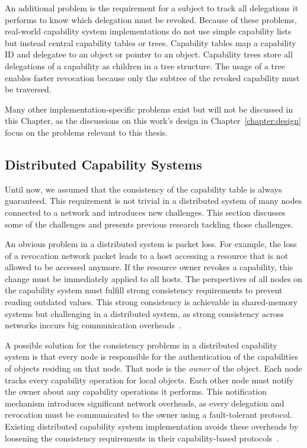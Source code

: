 An additional problem is the requirement for a subject to track all delegations it performs to know which delegation must be revoked. Because of these problems, real-world capability system implementations do not use simple capability lists but instead central capability tables or trees. Capability tables map a capability ID and delegatee to an object or pointer to an object. Capability trees store all delegations of a capability as children in a tree structure. The usage of a tree enables faster revocation because only the subtree of the revoked capability must be traversed.

Many other implementation-specific problems exist but will not be discussed in this Chapter, as the discussions on this work's design in Chapter~\ref{chapter:design} focus on the problems relevant to this thesis.

\subsection{Distributed Capability Systems}
Until now, we assumed that the consistency of the capability table is always guaranteed. This requirement is not trivial in a distributed system of many nodes connected to a network and introduces new challenges. This section discusses some of the challenges and presents previous research tackling those challenges.

An obvious problem in a distributed system is packet loss. For example, the loss of a revocation network packet leads to a host accessing a resource that is not allowed to be accessed anymore. If the resource owner revokes a capability, this change must be immediately applied to all hosts. The perspectives of all nodes on the capability system must fulfill strong consistency requirements to prevent reading outdated values. This strong consistency is achievable in shared-memory systems but challenging in a distributed system, as strong consistency across networks inccurs big communication overheads~\cite{abdullahiGarbageCollectingInternet1998}.\@

A possible solution for the consistency problems in a distributed capability system is that every node is responsible for the authentication of the capabilities of objects residing on that node. That node is the \emph{owner} of the object. Each node tracks every capability operation for local objects. Each other node must notify the owner about any capability operations it performs. This notification mechanism introduces significant network overheads, as every delegation and revocation must be communicated to the owner using a fault-tolerant protocol. Existing distributed capability system implementation avoids these overheads by loosening the consistency requirements in their capability-based protocols~\cite{UsingSparseCapabilities1986, vilanovaSlashingDisaggregationTax2022, hilleSemperOSDistributedCapability2019}.\@


